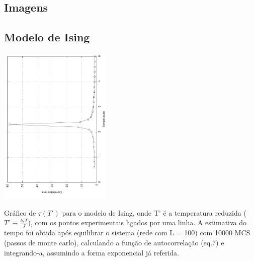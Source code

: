 \documentclass[a4paper,10pt]{article}
\makeatletter
\newenvironment{figurehere}
  {\def\@captype{figure}}
  {}
\makeatother
\begin{document}
\begin{multicols}{2}

\section{Imagens}
\subsection{Modelo de Ising}

\begin{figurehere}
	\centering
		\includegraphics[angle=270, width=0.4\textwidth]{images/ctimes}
	\caption{{\footnotesize Gráfico de $\tau(T')$ para o modelo de Ising, onde T' é a temperatura reduzida ($T'\equiv\frac{k_b T}{J}$), com os pontos experimentais ligados por uma linha. A estimativa do tempo foi obtida após equilibrar o sistema (rede com L = 100) com 10000 MCS (passos de monte carlo), calculando a função de autocorrelação (eq.7) e integrando-a, assumindo a forma exponencial já referida.}}
	\label{fig:1}
\end{figurehere}
\end{multicols}
\end{document}
